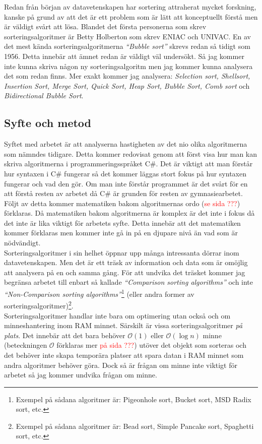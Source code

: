 \documentclass[twocolumn, a4]{article}
\begin{document}
Redan från början av datavetenskapen har sortering attraherat mycket forskning, kanske på grund av att det är ett problem som är lätt att konceptuellt förstå men är väldigt svårt att lösa. Blandet det första personerna som skrev sorteringsalgoritmer är Betty Holberton som skrev ENIAC och UNIVAC. En av det mest kända sorteringsalgoritmerna \textit{“Bubble sort”} skrevs redan så tidigt som 1956. Detta innebär att ämnet redan är väldigt väl undersökt. Så jag kommer inte kunna skriva någon ny sorteringsalgoritm men jag kommer kunna analysera det som redan finns. \cite{1} Mer exakt kommer jag analysera: \textit{Selection sort, Shellsort, Insertion Sort, Merge Sort, Quick Sort, Heap Sort, Bubble Sort, Comb sort} och \textit{Bidirectional Bubble Sort}.

\subsection{Syfte och metod}
Syftet med arbetet är att analyserna hastigheten av det nio olika algoritmerna som nämndes tidigare. Detta kommer redovisat genom att först visa hur man kan skriva algoritmerna i programmeringsspråket C\#. Det är viktigt att man förstår hur syntaxen i C\# fungerar så det kommer läggas stort fokus på hur syntaxen fungerar och vad den gör. Om man inte förstår programmet är det svårt för en att förstå resten av arbetet då C\# är grunden för resten av gymnasiearbetet. Följt av detta kommer matematiken bakom algoritmernas ordo (\textcolor{red}{se sida ???}) förklaras. Då matematiken bakom algoritmerna är komplex är det inte i fokus då det inte är lika viktigt för arbetets syfte. Detta innebär att det matematiken kommer förklaras men kommer inte gå in på en djupare nivå än vad som är nödvändigt.\\
Sorteringsalgoritmer i sin helhet öppnar upp många intressanta dörrar inom datavetenskapen. Men det är ett träsk av information och data som är omöjlig att analysera på en och samma gång. För att undvika det träsket kommer jag begränsa arbetet till enbart så kallade \textit{“Comparison sorting algorithms”} och inte \textit{“Non-Comparison sorting algorithms”}\footnote{Exempel på sådana algoritmer är: Pigeonhole sort, Bucket sort, MSD Radix sort, etc.} (eller andra former av sorteringsalgoritmer)\footnote{Exempel på sådana algoritmer är: Bead sort, Simple Pancake sort, Spaghetti sort, etc.}.\\
Sorteringsalgoritmer handlar inte bara om optimering utan också och om minneshantering inom RAM minnet. Särskilt är vissa sorteringsalgoritmer \textit{på plats}. Det innebär att det bara behöver $\mathcal{O}(1)$ eller $\mathcal{O}(\log{n})$ minne (beteckningen $\mathcal{O}$ förklaras mer \textcolor{red}{på sida ???}) utöver det objekt som sorteras och det behöver inte skapa temporära platser att spara datan i RAM minnet som andra algoritmer behöver göra. \cite{3} Dock så är frågan om minne inte viktigt för arbetet så jag kommer undvika frågan om minne. 
\end{document}

